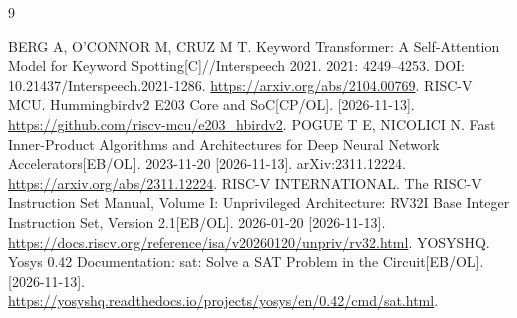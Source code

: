 \documentclass[UTF8,punct,fontset=none,zihao=-4]{ctexart}
\begin{document}
\clearpage
\begin{thebibliography}{9}
\raggedright
\setlength{\itemsep}{9pt}
 BERG A, O'CONNOR M, CRUZ M T. Keyword Transformer: A Self-Attention Model for Keyword Spotting[C]//Interspeech 2021. 2021: 4249–4253. DOI: 10.21437/Interspeech.2021-1286. \url{https://arxiv.org/abs/2104.00769}.
 RISC-V MCU. Hummingbirdv2 E203 Core and SoC[CP/OL]. [2026-11-13]. \url{https://github.com/riscv-mcu/e203_hbirdv2}.
 POGUE T E, NICOLICI N. Fast Inner-Product Algorithms and Architectures for Deep Neural Network Accelerators[EB/OL]. 2023-11-20 [2026-11-13]. arXiv:2311.12224. \url{https://arxiv.org/abs/2311.12224}.
 RISC-V INTERNATIONAL. The RISC-V Instruction Set Manual, Volume I: Unprivileged Architecture: RV32I Base Integer Instruction Set, Version 2.1[EB/OL]. 2026-01-20 [2026-11-13]. \url{https://docs.riscv.org/reference/isa/v20260120/unpriv/rv32.html}.
 YOSYSHQ. Yosys 0.42 Documentation: sat: Solve a SAT Problem in the Circuit[EB/OL]. [2026-11-13]. \url{https://yosyshq.readthedocs.io/projects/yosys/en/0.42/cmd/sat.html}.
\end{thebibliography}
\end{document}
